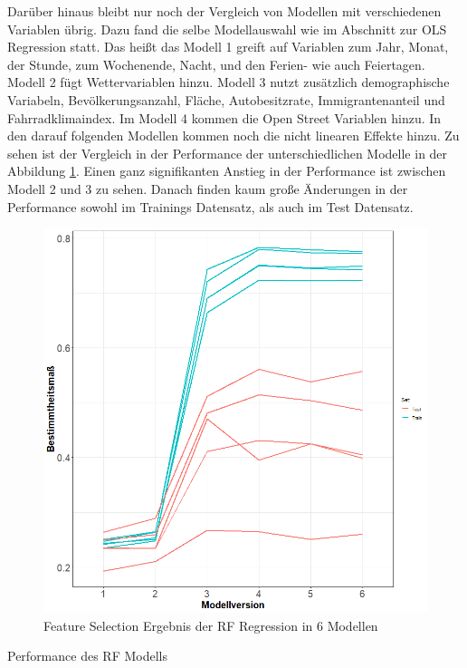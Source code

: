 \documentclass[a4paper,12pt]{thesis}
\begin{document}
Darüber hinaus bleibt nur noch der Vergleich von Modellen mit verschiedenen Variablen übrig. Dazu fand die selbe Modellauswahl wie im Abschnitt zur OLS Regression statt. Das heißt das Modell 1 greift auf Variablen zum Jahr, Monat, der Stunde, zum Wochenende, Nacht, und den Ferien- wie auch Feiertagen. Modell 2 fügt Wettervariablen hinzu. Modell 3 nutzt zusätzlich demographische Variabeln, Bevölkerungsanzahl, Fläche, Autobesitzrate, Immigrantenanteil und Fahrradklimaindex. Im Modell 4 kommen die Open Street Variablen hinzu. In den darauf folgenden Modellen kommen noch die nicht linearen Effekte hinzu. Zu sehen ist der Vergleich in der Performance der unterschiedlichen Modelle in der Abbildung \ref{RF_ModelSelection}. Einen ganz signifikanten Anstieg in der Performance ist zwischen Modell 2 und 3 zu sehen. Danach finden kaum große Änderungen in der Performance sowohl im Trainings Datensatz, als auch im Test Datensatz.

\begin{figure}[!ht]
	\centering
	\includegraphics[width=\textwidth]{Plots/plot40.png}
	\caption{Feature Selection Ergebnis der RF Regression in 6 Modellen}
	\label{RF_ModelSelection}
\end{figure}

\begin{table}
	\caption{Performance des RF Modells}
	\label{tbl:FR1}
\end{table}
\end{document}
